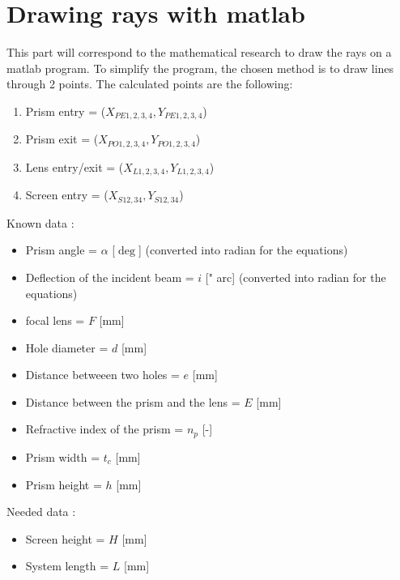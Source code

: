 \section{Drawing rays with matlab}
This part will correspond to the mathematical research to draw the rays on a matlab program. To simplify the program,
the chosen method is to draw lines through 2 points. The calculated points are the following:
\begin{enumerate}
    \item Prism entry = ($X_{PE1,2,3,4},Y_{PE1,2,3,4}$)
    \item Prism exit = ($X_{PO1,2,3,4},Y_{PO1,2,3,4}$)
    \item Lens entry/exit = ($X_{L1,2,3,4},Y_{L1,2,3,4}$)
    \item Screen entry = ($X_{S12,34},Y_{S12,34}$)
\end{enumerate}
Known data :
\begin{itemize}
    \item Prism angle = $\alpha$ [$\deg$] (converted into radian for the equations)
    \item Deflection of the incident beam = $i$ [" arc] (converted into radian for the equations)
    \item focal lens = $F$ [mm]
    \item Hole diameter = $d$ [mm]
    \item Distance betweeen two holes = $e$ [mm]
    \item Distance between the prism and the lens = $E$ [mm]
    \item Refractive index of the prism = $n_p$ [-]
    \item Prism width = $t_c$ [mm]
    \item Prism height = $h$ [mm]
\end{itemize}
Needed data :
\begin{itemize}
    \item Screen height = $H$ [mm]
    \item System length = $L$ [mm]
\end{itemize}
\newpage
